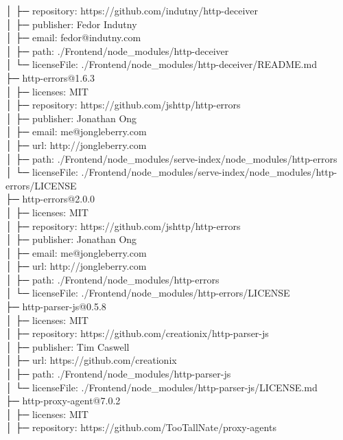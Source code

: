 │  ├─ repository: https://github.com/indutny/http-deceiver\\
│  ├─ publisher: Fedor Indutny\\
│  ├─ email: fedor@indutny.com\\
│  ├─ path: ./Frontend/node\_modules/http-deceiver\\
│  └─ licenseFile: ./Frontend/node\_modules/http-deceiver/README.md\\
├─ http-errors@1.6.3\\
│  ├─ licenses: MIT\\
│  ├─ repository: https://github.com/jshttp/http-errors\\
│  ├─ publisher: Jonathan Ong\\
│  ├─ email: me@jongleberry.com\\
│  ├─ url: http://jongleberry.com\\
│  ├─ path: ./Frontend/node\_modules/serve-index/node\_modules/http-errors\\
│  └─ licenseFile: ./Frontend/node\_modules/serve-index/node\_modules/http-errors/LICENSE\\
├─ http-errors@2.0.0\\
│  ├─ licenses: MIT\\
│  ├─ repository: https://github.com/jshttp/http-errors\\
│  ├─ publisher: Jonathan Ong\\
│  ├─ email: me@jongleberry.com\\
│  ├─ url: http://jongleberry.com\\
│  ├─ path: ./Frontend/node\_modules/http-errors\\
│  └─ licenseFile: ./Frontend/node\_modules/http-errors/LICENSE\\
├─ http-parser-js@0.5.8\\
│  ├─ licenses: MIT\\
│  ├─ repository: https://github.com/creationix/http-parser-js\\
│  ├─ publisher: Tim Caswell\\
│  ├─ url: https://github.com/creationix\\
│  ├─ path: ./Frontend/node\_modules/http-parser-js\\
│  └─ licenseFile: ./Frontend/node\_modules/http-parser-js/LICENSE.md\\
├─ http-proxy-agent@7.0.2\\
│  ├─ licenses: MIT\\
│  ├─ repository: https://github.com/TooTallNate/proxy-agents\\

